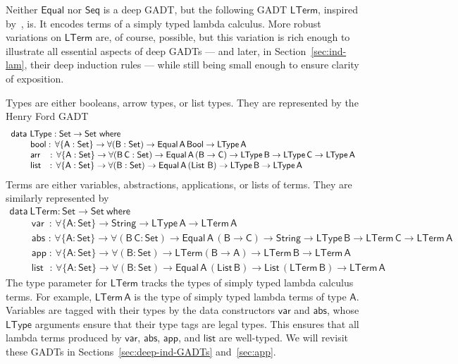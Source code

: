 \documentclass[9pt]{entcs}
\begin{document}
Neither $\mathsf{Equal}$ nor $\mathsf{Seq}$ is a deep GADT, but the
following GADT $\mathsf{LTerm}$, inspired by~\cite{cis194}, is.  It
encodes terms of a simply typed lambda calculus. More robust
variations on $\mathsf{LTerm}$ are, of course, possible, but this
variation is rich enough to illustrate all essential aspects of deep
GADTs --- and later, in Section~\ref{sec:ind-lam}, their deep
induction rules --- while still being small enough to ensure clarity
of exposition.

Types are either booleans, arrow types, or list types. They are
represented by the Henry Ford GADT
\begin{equation}\label{eq:eq_ltype}
\begin{array}{l}
\mathsf{data\ LType : Set \to Set\ where}\\
\mathsf{\;\;\;\;\;\;\;\;bool :\, \forall \{A : Set\} \to \forall (B : Set) \to Equal\,A\,Bool
  \to LType\,A}\\ 
\mathsf{\;\;\;\;\;\;\;\;arr\;\;\; :\, \forall \{A : Set\} \to \forall (B\,C : Set) \to
  Equal\,A\,(B \to C) \to LType\,B \to LType\,C \to LType\,A}\\ 
  \mathsf{\;\;\;\;\;\;\;\;list\,\;\; :\,  \forall \{A : Set\} \to\forall (B : Set) \to
    Equal\,A\,(\mathsf{List}\,\,B) \to LType\,B \to LType\,A} 
\end{array}
\end{equation}
Terms are either variables, abstractions, applications, or lists of
terms. They are similarly represented by
\begin{equation}\label{eq:eq_lterm}
\begin{array}{l}
\mathsf{data\ LTerm : Set \to Set\ where}\\
\mathsf{\;\;\;\;\;\;\;\;var\,\,\,:\,  \forall \{A : Set\} \to String \to LType\,A \to
  LTerm\,A} \\  
\mathsf{\;\;\;\;\;\;\;\;abs\,\, :\,  \forall \{A : Set\} \to \forall (B\,C : Set) \to
  Equal\,A\,(B \to C) \to String \to LType\,B \to LTerm\,C \to
  LTerm\,A}\\ 
  \mathsf{\;\;\;\;\;\;\;\;app\; :\,  \forall \{A : Set\} \to \forall (B : Set) \to
    LTerm (B \to A) \to LTerm\,B \to LTerm\,A} \\ 
  \mathsf{\;\;\;\;\;\;\;\;list\;\,\, :\,  \forall \{A : Set\} \to \forall (B : Set) \to
    Equal\,A\,(List\,B) \to List\,(LTerm\,B) \to LTerm\,A} 
\end{array}
\end{equation}
The type parameter for $\mathsf{LTerm}$ tracks the types of simply
typed lambda calculus terms. For example, $\mathsf{LTerm\,A}$ is the
type of simply typed lambda terms of type $\mathsf{A}$. Variables are
tagged with their types by the data constructors $\mathsf{var}$ and
$\mathsf{abs}$, whose $\mathsf{LType}$ arguments ensure that their
type tags are legal types. This ensures that all lambda terms
produced by $\mathsf{var}$, $\mathsf{abs}$, $\mathsf{app}$, and
$\mathsf{list}$ are well-typed.  We will revisit these GADTs in
Sections~\ref{sec:deep-ind-GADTs} and~\ref{sec:app}.
\end{document}
